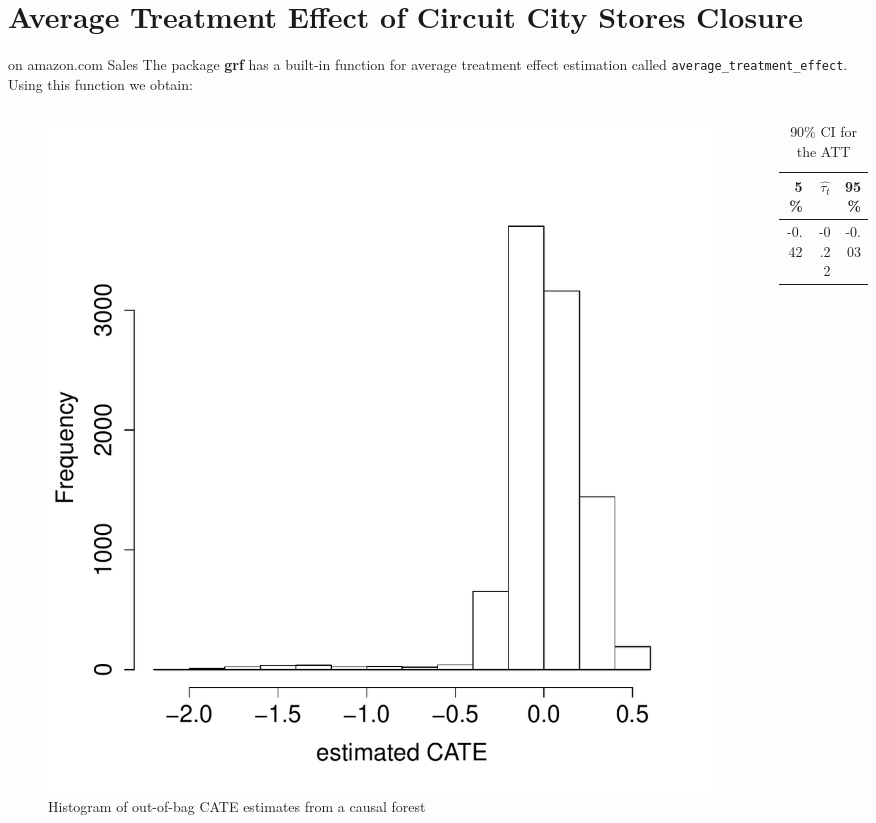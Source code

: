 \documentclass[mathserif, xcolor=table]{beamer}
\begin{document}
\section{Average Treatment Effect of Circuit City Stores Closure}
\begin{frame}{on amazon.com Sales}
The package \textbf{grf} has a built-in function for average treatment effect estimation called \texttt{average\_treatment\_effect}. Using this function we obtain:
\vspace{-1em}
\begin{columns}
\begin{column}{.6\textwidth}
 \begin{figure}[h]
    \centering
    \includegraphics[scale=0.3]{figures/tauhat1_ama_hist.pdf}
    \caption{ Histogram of out-of-bag CATE estimates from a causal forest}
    \label{fig:tauhat1_ama_hist}
\end{figure}
 \end{column}

 \begin{column}{.39\textwidth}
 \begin{table}[h]
\label{}
\caption{90\% CI for the ATT}
\centering
\begin{tabular}{rrr}
  \hline
 5\%  & $\hat{\tau_t}$ & 95\% \\ 
  \hline
-0.42 & -0.22 & -0.03 \\ 
   \hline
\end{tabular}
 \end{table}
 \end{column}
\end{columns}
  \end{frame}
\end{document}
